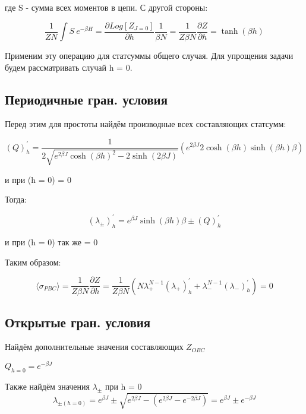 \documentclass{article}
\newcommand{\bj}{\beta J}
\newcommand{\bh}{\beta h}
\newcommand{\lpm}{\lambda_{\pm}}
\newcommand{\obc}{_{OBC}}
\newcommand{\la}{\langle}
\newcommand{\ra}{\rangle}
\numberwithin{equation}{section}
\begin{document}
где S - сумма всех моментов в цепи. С другой стороны: 

\begin{equation}\label{MeanMagnJ02}
    \frac{1}{ZN} \int S\ e^{-\beta H} = \frac{\partial Log[Z_{J = 0}]}{\partial h} \frac{1}{\beta N} = \frac{1}{Z \beta N}  \frac{\partial Z}{\partial h} = \tanh{(\bh)}
\end{equation}

Применим эту операцию для статсуммы общего случая.
Для упрощения задачи будем рассматривать случай h = 0.

\subsection{Периодичные гран. условия}

Перед этим для простоты найдём производные всех составляющих статсумм:

\begin{equation}\label{Q'h}
    (Q)^{'}_{h} = \frac{1}{2\sqrt{e^{2\bj} \cosh{(\bh)}^{2} - 2 \sinh{(2\bj)}}}  \left( e^{2\bj}2\cosh{(\bh)} \sinh{(\bh)}  \beta\right)
\end{equation}

и при (h = 0) = 0

Тогда:

\begin{equation}\label{lpm'h}
    (\lpm)^{'}_{h} = e^{\bj}  \sinh{(\bh)} \beta \pm (Q)^{'}_{h}
\end{equation}

и при (h = 0) так же = 0

Таким образом: 

\begin{equation}\label{MeanMagnH0PBC}
    \la\sigma_{PBC}\ra = \frac{1}{Z  \beta  N}  \frac{\partial Z}{\partial h} = \frac{1}{Z  \beta  N}  \left( N  \lambda^{N-1}_{+}(\lambda_{+})^{'}_{h} +   \lambda^{N-1}_{-}(\lambda_{-})^{'}_{h}\right) = 0
\end{equation}

\subsection{Открытые гран. условия}

Найдём дополнительные значения составляющих $Z\obc$

$Q_{h = 0} = e^{-\bj}$

Также найдём значения $\lambda_{\pm}$ при h = 0
\begin{equation}\label{lpmH0}
    \lambda_{\pm (h=0)} = e^{\bj} \pm \sqrt{e^{2\bj} - \left( e^{2\bj} - e^{-2\bj} \right)} = e^{\bj} \pm e^{-\bj}
\end{equation}
\end{document}
